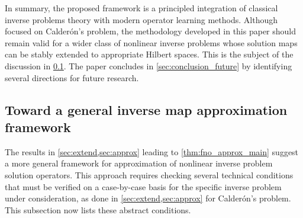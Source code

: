 \documentclass[pdflatex,sn-mathphys-num]{sn-jnl-preprint}
\theoremstyle{thmstyleone}%
\theoremstyle{thmstyletwo}%
\theoremstyle{thmstylethree}%
\numberwithin{equation}{section}
\numberwithin{theorem}{section}
\begin{document}
In summary, the proposed framework is a principled integration of classical inverse problems theory with modern operator learning methods. Although focused on Calder\'on's problem, the methodology developed in this paper should remain valid for a wider class of nonlinear inverse problems whose solution maps can be stably extended to appropriate Hilbert spaces. This is the subject of the discussion in \cref{sec:conclusion_general}. The paper concludes in \cref{sec:conclusion_future} by identifying several directions for future research.

\subsection{Toward a general inverse map approximation framework}\label{sec:conclusion_general}
The results in \cref{sec:extend,sec:approx} leading to \cref{thm:fno_approx_main} suggest a more general framework for approximation of nonlinear inverse problem solution operators. This approach requires checking several technical conditions that must be verified on a case-by-case basis for the specific inverse problem under consideration, as done in \cref{sec:extend,sec:approx} for Calder\'on's problem. This subsection now lists these abstract conditions.
\end{document}
